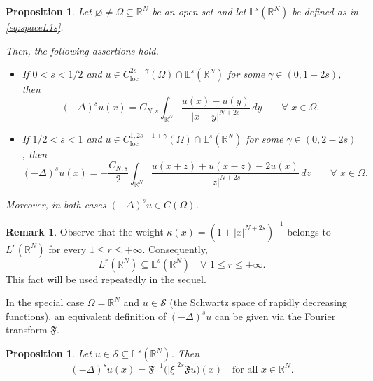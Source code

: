 \documentclass[11pt,a4paper,reqno]{amsart}
\def \R {\mathbb{R}}
\theoremstyle{definition}
\newtheorem{remark}[definition]{Remark}
\theoremstyle{plain}
\newtheorem{proposition}[definition]{Proposition}
\numberwithin{equation}{section}
\begin{document}
\begin{proposition} \label{prop:welldefDeltas}
Let $\varnothing\neq\Omega\subseteq\R^N$ be an open set and let $\mathbb{L}^s(\mathbb{R}^N)$ be defined as in \eqref{eq:spaceL1s}.

Then, the following assertions hold.
\begin{itemize}
 \item[{i)}] If $0<s<1/2$ and $u\in C_{\mathrm{loc}}^{2s+\gamma}(\Omega)\cap \mathbb{L}^s(\R^N)$ for some $\gamma \in (0,1-2s)$, then
 $$
 (-\Delta)^s u(x) = C_{N,s}\int_{\R^N}\frac{u(x)-u(y)}{|x-y|^{N+2s}}\,dy\qquad\forall\,\,x\in\Omega.
 $$

 \item[{ii)}] If $1/2<s<1$ and $u\in C^{1,2s-1+\gamma}_{\mathrm{loc}}(\Omega)\cap \mathbb{L}^s(\R^N)$ for some $\gamma\in (0,2-2s)$, then
 $$
 (-\Delta)^s u(x) = -\frac{C_{N,s}}{2}\int_{\R^N}\frac{u(x+z)+u(x-z)-2u(x)}{|z|^{N+2s}}\,dz\qquad\forall\,\,x\in\Omega.
 $$

\end{itemize}
Moreover, in both cases $(-\Delta)^s u\in C(\Omega)$.
\end{proposition}

\begin{remark} \label{rem:BoundedLs}
Observe that the weight $\kappa(x) = (1+|x|^{N+2s})^{-1}$ belongs to $L^r(\mathbb{R}^N)$ for every $1\leq r\leq +\infty$. Consequently,
\begin{equation} \label{eq:LinfinLs}
L^r(\mathbb{R}^N)\subseteq \mathbb{L}^s(\mathbb{R}^N)\quad\forall\,\,1\leq r\leq+\infty.
\end{equation}
This fact will be used repeatedly in the sequel.
\end{remark}

In the special case $\Omega = \R^N$ and $u\in\mathcal{S}$ (the Schwartz space of rapidly decreasing functions), an equivalent definition of $(-\Delta)^s u$ can be given via the Fourier transform $\mathfrak{F}$.

\begin{proposition} \label{prop:DeltasFourier}
Let $u\in\mathcal{S}\subseteq \mathbb{L}^s(\R^N)$. Then
\begin{equation} \label{eq23}
(-\Delta)^s u(x) = \mathfrak F^{-1} \big( |\xi|^{2s}\mathfrak F u  \big)(x)
\quad \text{for all } x\in\R^N.
\end{equation}
\end{proposition}
\end{document}
